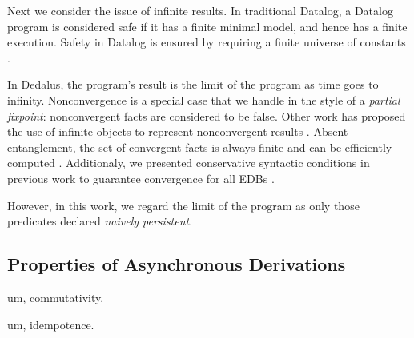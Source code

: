 
Next we consider the issue of infinite results.  In traditional Datalog, a Datalog program is considered safe if it has a finite
minimal model, and hence has a finite execution. Safety in Datalog is ensured by requiring a finite universe of constants .

In Dedalus, the program's result is the limit of the program as time goes to infinity.  Nonconvergence is a special case that we handle in the style of a {\em partial fixpoint}: nonconvergent facts are considered to be false.  Other work has proposed the use of infinite objects to represent nonconvergent results .  Absent entanglement, the set of convergent facts is always finite and can be efficiently computed .  Additionaly, we presented conservative syntactic conditions in previous work to guarantee convergence for all EDBs .

However, in this work, we regard the limit of the program as only those predicates declared {\em naively persistent}.  

\subsection{Properties of Asynchronous Derivations}

um, commutativity.

um, idempotence.

